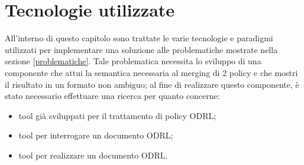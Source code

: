 \documentclass[12pt,a4paper,twoside]{book}
\begin{document}
\chapter{Tecnologie utilizzate}
All'interno di questo capitolo sono trattate le varie tecnologie e paradigmi utilizzati per implementare una soluzione alle problematiche mostrate nella sezione \ref{problematiche}. Tale problematica necessita lo sviluppo di una componente che attui la semantica necessaria al merging di 2 policy e che mostri il risultato in un formato non ambiguo; al fine di realizzare questo componente, è stato necessario effettuare una ricerca per quanto concerne:
\begin{itemize}
	\item tool già sviluppati per il trattamento di policy ODRL;
	\item tool per interrogare un documento ODRL;
	\item tool per realizzare un documento ODRL.
\end{itemize}
\end{document}
